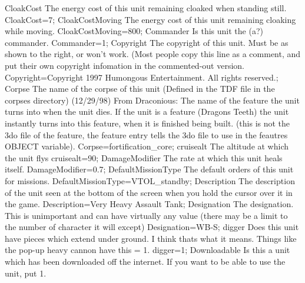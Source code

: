\documentclass[a4paper,10pt]{article}
\begin{document}
CloakCost 	The energy cost of this unit remaining cloaked when standing still. 	CloakCost=7;
CloakCostMoving 	The energy cost of this unit remaining cloaking while moving. 	CloakCostMoving=800;
Commander 	Is this unit the (a?) commander. 	Commander=1;
Copyright 	The copyright of this unit. Must be as shown to the right, or won't work.  (Most people copy this line as a comment, and put their own copyright infomation in the commented-out version. 	Copyright=Copyright 1997 Humongous Entertainment. All rights reserved.;
Corpse 	The name of the corpse of this unit (Defined in the TDF file in the corpses directory)  (12/29/98)  From Draconious:  The name of the feature the unit turns into when the unit dies. If the unit is a feature (Dragons Teeth) the unit instantly turns into this feature, when it is finished being built. (this is not the 3do file of the feature, the feature entry tells the 3do file to use in the feautres OBJECT variable). 	Corpse=fortification\_core;
cruisealt 	The altitude at which the unit flys 	cruisealt=90;
DamageModifier 	The rate at which this unit heals itself. 	DamageModifier=0.7;
DefaultMissionType 	The default orders of this unit for missions. 	DefaultMissionType=VTOL\_standby;
Description 	The description of the unit seen at the bottom of the screen when you hold the cursor over it in the game. 	Description=Very Heavy Assault Tank;
Designation 	The designation. This is unimportant and can have virtually any value (there may be a limit to the number of character it will except) 	Designation=WB-S;
digger 	Does this unit have pieces which extend under ground.  I think thats what it means. Things like the pop-up heavy cannon have this = 1. 	digger=1;
Downloadable 	Is this a unit which has been downloaded off the internet. If you want to be able to use the unit, put 1.
\end{document}
